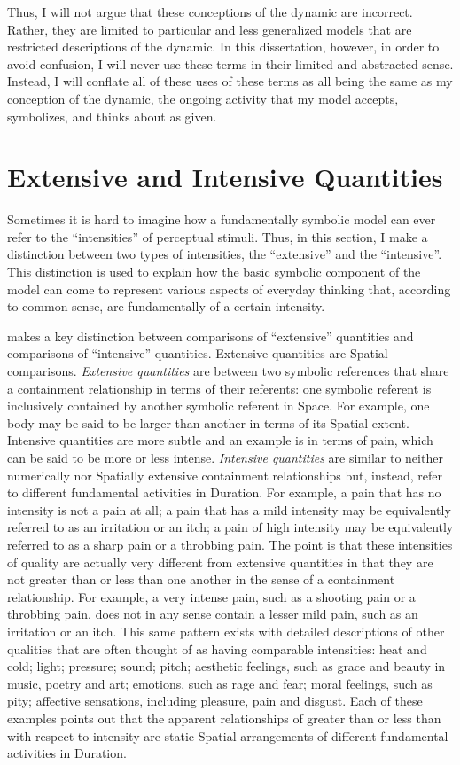 Thus, I will not argue that these conceptions of the dynamic are
incorrect.  Rather, they are limited to particular and less
generalized models that are restricted descriptions of the dynamic.
In this dissertation, however, in order to avoid confusion, I will
never use these terms in their limited and abstracted sense.  Instead,
I will conflate all of these uses of these terms as all being the same
as my conception of the dynamic, the ongoing activity that my model
accepts, symbolizes, and thinks about as given.

\section{Extensive and Intensive Quantities}
\label{section:extensive_and_intensive_quantities}

Sometimes it is hard to imagine how a fundamentally symbolic model can
ever refer to the ``intensities'' of perceptual stimuli.  Thus, in
this section, I make a distinction between two types of intensities,
the ``extensive'' and the ``intensive''.  This distinction is used to
explain how the basic symbolic component of the model can come to
represent various aspects of everyday thinking that, according to
common sense, are fundamentally of a certain intensity.

\cite{bergson:1910} makes a key distinction between comparisons of
``extensive'' quantities and comparisons of ``intensive'' quantities.
Extensive quantities are Spatial comparisons.  \emph{Extensive
  quantities} are between two symbolic references that share a
containment relationship in terms of their referents: one symbolic
referent is inclusively contained by another symbolic referent in
Space.  For example, one body may be said to be larger than another in
terms of its Spatial extent.  Intensive quantities are more subtle and
an example is in terms of pain, which can be said to be more or less
intense.  \emph{Intensive quantities} are similar to neither
numerically nor Spatially extensive containment relationships but,
instead, refer to different fundamental activities in Duration.  For
example, a pain that has no intensity is not a pain at all; a pain
that has a mild intensity may be equivalently referred to as an
irritation or an itch; a pain of high intensity may be equivalently
referred to as a sharp pain or a throbbing pain.  The point is that
these intensities of quality are actually very different from
extensive quantities in that they are not greater than or less than
one another in the sense of a containment relationship.  For example,
a very intense pain, such as a shooting pain or a throbbing pain, does
not in any sense contain a lesser mild pain, such as an irritation or
an itch.  This same pattern exists with detailed descriptions of other
qualities that are often thought of as having comparable intensities:
heat and cold; light; pressure; sound; pitch; aesthetic feelings, such
as grace and beauty in music, poetry and art; emotions, such as rage
and fear; moral feelings, such as pity; affective sensations,
including pleasure, pain and disgust.  Each of these examples points
out that the apparent relationships of greater than or less than with
respect to intensity are static Spatial arrangements of different
fundamental activities in Duration.

